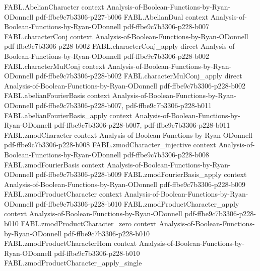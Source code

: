 \begin{theorem}
\label{FABL.abelianConvolution_comm}
\leanok
{}
\proofstep
  {FABL.AbelianCharacter}
  {context}
  {Analysis-of-Boolean-Functions-by-Ryan-ODonnell}
  {pdf-ffbe9c7b3306-p227-b006}
\proofstep
  {FABL.AbelianDual}
  {context}
  {Analysis-of-Boolean-Functions-by-Ryan-ODonnell}
  {pdf-ffbe9c7b3306-p228-b007}
\proofstep
  {FABL.characterConj}
  {context}
  {Analysis-of-Boolean-Functions-by-Ryan-ODonnell}
  {pdf-ffbe9c7b3306-p228-b002}
\proofstep
  {FABL.characterConj_apply}
  {direct}
  {Analysis-of-Boolean-Functions-by-Ryan-ODonnell}
  {pdf-ffbe9c7b3306-p228-b002}
\proofstep
  {FABL.characterMulConj}
  {context}
  {Analysis-of-Boolean-Functions-by-Ryan-ODonnell}
  {pdf-ffbe9c7b3306-p228-b002}
\proofstep
  {FABL.characterMulConj_apply}
  {direct}
  {Analysis-of-Boolean-Functions-by-Ryan-ODonnell}
  {pdf-ffbe9c7b3306-p228-b002}
\proofstep
  {FABL.abelianFourierBasis}
  {context}
  {Analysis-of-Boolean-Functions-by-Ryan-ODonnell}
  {pdf-ffbe9c7b3306-p228-b007,
    pdf-ffbe9c7b3306-p228-b011}
\proofstep
  {FABL.abelianFourierBasis_apply}
  {context}
  {Analysis-of-Boolean-Functions-by-Ryan-ODonnell}
  {pdf-ffbe9c7b3306-p228-b007,
    pdf-ffbe9c7b3306-p228-b011}
\proofstep
  {FABL.zmodCharacter}
  {context}
  {Analysis-of-Boolean-Functions-by-Ryan-ODonnell}
  {pdf-ffbe9c7b3306-p228-b008}
\proofstep
  {FABL.zmodCharacter_injective}
  {context}
  {Analysis-of-Boolean-Functions-by-Ryan-ODonnell}
  {pdf-ffbe9c7b3306-p228-b008}
\proofstep
  {FABL.zmodFourierBasis}
  {context}
  {Analysis-of-Boolean-Functions-by-Ryan-ODonnell}
  {pdf-ffbe9c7b3306-p228-b009}
\proofstep
  {FABL.zmodFourierBasis_apply}
  {context}
  {Analysis-of-Boolean-Functions-by-Ryan-ODonnell}
  {pdf-ffbe9c7b3306-p228-b009}
\proofstep
  {FABL.zmodProductCharacter}
  {context}
  {Analysis-of-Boolean-Functions-by-Ryan-ODonnell}
  {pdf-ffbe9c7b3306-p228-b010}
\proofstep
  {FABL.zmodProductCharacter_apply}
  {context}
  {Analysis-of-Boolean-Functions-by-Ryan-ODonnell}
  {pdf-ffbe9c7b3306-p228-b010}
\proofstep
  {FABL.zmodProductCharacter_zero}
  {context}
  {Analysis-of-Boolean-Functions-by-Ryan-ODonnell}
  {pdf-ffbe9c7b3306-p228-b010}
\proofstep
  {FABL.zmodProductCharacterHom}
  {context}
  {Analysis-of-Boolean-Functions-by-Ryan-ODonnell}
  {pdf-ffbe9c7b3306-p228-b010}
\proofstep
  {FABL.zmodProductCharacter_apply_single}

\end{theorem}
